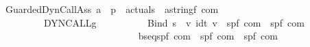 \begin{isabellebody}
\ \ \ \ \ \ \ {\isachardoublequoteopen}{\isacharunderscore}GuardedDynCallAss{\isachardoublequoteclose}{\isacharcolon}{\isacharcolon}\ {\isachardoublequoteopen}{\isacharprime}a\ {\isasymRightarrow}\ {\isacharprime}p\ {\isasymRightarrow}\ actuals\ {\isasymRightarrow}\ {\isacharparenleft}{\isacharparenleft}{\isacharprime}a{\isacharcomma}string{\isacharcomma}{\isacharprime}f{\isacharparenright}\ com{\isacharparenright}{\isachardoublequoteclose}\ \isanewline
\ \ \ \ \ \ \ \ \ \ \ \ \ {\isacharparenleft}{\isachardoublequoteopen}{\isacharunderscore}\ {\isacharcolon}{\isacharequal}{\isacharequal}\ DYNCALL\isactrlsub g\ {\isacharunderscore}{\isacharunderscore}{\isachardoublequoteclose}\ {\isacharbrackleft}{}{}{\isacharcomma}{}{}{}{}{\isacharcomma}{}{}{}{}{\isacharbrackright}\ {}{}{\isacharparenright}\isanewline
\isanewline
\ \ \ \ \ \ \ {\isachardoublequoteopen}{\isacharunderscore}Bind{\isachardoublequoteclose}{\isacharcolon}{\isacharcolon}\ {\isachardoublequoteopen}{\isacharbrackleft}{\isacharprime}s\ {\isasymRightarrow}\ {\isacharprime}v{\isacharcomma}\ idt{\isacharcomma}\ {\isacharprime}v\ {\isasymRightarrow}\ {\isacharparenleft}{\isacharprime}s{\isacharcomma}{\isacharprime}p{\isacharcomma}{\isacharprime}f{\isacharparenright}\ com{\isacharbrackright}\ {\isasymRightarrow}\ {\isacharparenleft}{\isacharprime}s{\isacharcomma}{\isacharprime}p{\isacharcomma}{\isacharprime}f{\isacharparenright}\ com{\isachardoublequoteclose}\ \isanewline
\ \ \ \ \ \ \ \ \ \ \ \ \ \ \ \ \ \ \ \ \ \ {\isacharparenleft}{\isachardoublequoteopen}{\isacharunderscore}\ {\isasymggreater}\ {\isacharunderscore}{\isachardot}{\isacharslash}\ {\isacharunderscore}{\isachardoublequoteclose}\ {\isacharbrackleft}{}{}{\isacharcomma}{}{}{}{}{\isacharcomma}{}{}{\isacharbrackright}\ {}{}{\isacharparenright}\isanewline
\ \ \ \ \ \ \ {\isachardoublequoteopen}{\isacharunderscore}bseq{\isachardoublequoteclose}{\isacharcolon}{\isacharcolon}{\isachardoublequoteopen}{\isacharparenleft}{\isacharprime}s{\isacharcomma}{\isacharprime}p{\isacharcomma}{\isacharprime}f{\isacharparenright}\ com\ {\isasymRightarrow}\ {\isacharparenleft}{\isacharprime}s{\isacharcomma}{\isacharprime}p{\isacharcomma}{\isacharprime}f{\isacharparenright}\ com\ {\isasymRightarrow}\ {\isacharparenleft}{\isacharprime}s{\isacharcomma}{\isacharprime}p{\isacharcomma}{\isacharprime}f{\isacharparenright}\ com{\isachardoublequoteclose}\ \isanewline

\end{isabellebody}
